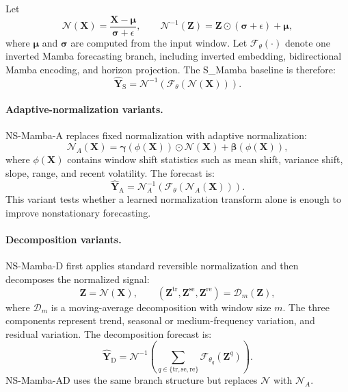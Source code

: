 Let
\begin{equation}
    \mathcal{N}(\mathbf{X})
    =
    \frac{\mathbf{X}-\boldsymbol{\mu}}{\boldsymbol{\sigma}+\epsilon},
    \qquad
    \mathcal{N}^{-1}(\mathbf{Z})
    =
    \mathbf{Z}\odot(\boldsymbol{\sigma}+\epsilon)+\boldsymbol{\mu},
\end{equation}
where $\boldsymbol{\mu}$ and $\boldsymbol{\sigma}$ are computed from the input window.
Let $\mathcal{F}_{\theta}(\cdot)$ denote one inverted Mamba forecasting branch, including inverted embedding, bidirectional Mamba encoding, and horizon projection.
The S\_Mamba baseline is therefore:
\begin{equation}
    \hat{\mathbf{Y}}_{\mathrm{S}}
    =
    \mathcal{N}^{-1}
    \left(
    \mathcal{F}_{\theta}(\mathcal{N}(\mathbf{X}))
    \right).
\end{equation}

\paragraph{Adaptive-normalization variants.}
NS-Mamba-A replaces fixed normalization with adaptive normalization:
\begin{equation}
    \mathcal{N}_{A}(\mathbf{X})
    =
    \boldsymbol{\gamma}(\phi(\mathbf{X}))
    \odot
    \mathcal{N}(\mathbf{X})
    +
    \boldsymbol{\beta}(\phi(\mathbf{X})),
\end{equation}
where $\phi(\mathbf{X})$ contains window shift statistics such as mean shift, variance shift, slope, range, and recent volatility.
The forecast is:
\begin{equation}
    \hat{\mathbf{Y}}_{\mathrm{A}}
    =
    \mathcal{N}_{A}^{-1}
    \left(
    \mathcal{F}_{\theta}(\mathcal{N}_{A}(\mathbf{X}))
    \right).
\end{equation}
This variant tests whether a learned normalization transform alone is enough to improve nonstationary forecasting.

\paragraph{Decomposition variants.}
NS-Mamba-D first applies standard reversible normalization and then decomposes the normalized signal:
\begin{equation}
    \mathbf{Z}=\mathcal{N}(\mathbf{X}),
    \qquad
    (\mathbf{Z}^{\mathrm{tr}}, \mathbf{Z}^{\mathrm{se}}, \mathbf{Z}^{\mathrm{re}})
    =
    \mathcal{D}_{m}(\mathbf{Z}),
\end{equation}
where $\mathcal{D}_{m}$ is a moving-average decomposition with window size $m$.
The three components represent trend, seasonal or medium-frequency variation, and residual variation.
The decomposition forecast is:
\begin{equation}
    \hat{\mathbf{Y}}_{\mathrm{D}}
    =
    \mathcal{N}^{-1}
    \left(
    \sum_{q \in \{\mathrm{tr},\mathrm{se},\mathrm{re}\}}
    \mathcal{F}_{\theta_q}(\mathbf{Z}^{q})
    \right).
\end{equation}
NS-Mamba-AD uses the same branch structure but replaces $\mathcal{N}$ with $\mathcal{N}_A$.

